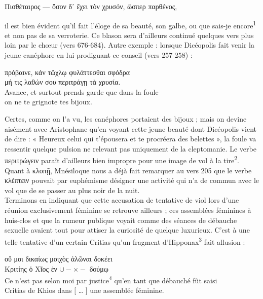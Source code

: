 \documentclass[12pt]{book}%
\newcommand{\italique}[1]{\textit{#1}}%
\newcommand{\citComm}[1]{\begin{quoting}[vskip=0pt] #1 \end{quoting}}%
\newcommand{\espace}[1]{\hspace{#1}}%
\newcommand{\francais}[1]{{\policeFr #1}}%
\newcommand{\debutNote}[1]{\edtext{}{\Cfootnote[nonum, nosep]{\espace{-1cm}\espace{-15pt}\textbf{\textbf{#1}}}}}%
\newcommand{\note}[2]{\edtext{}{\Cfootnote[nonum, nosep]{\espace{-15pt}\textbf{#1} #2}}}%
\newcommand{\marqueur}[1]{\textsuperscript{#1}}%
\newenvironment{groupe}{%
\pstart%
\ledgroup%
}{%
\pend %
}%
\begin{document}
\begin{pages}
\begin{Leftside}
\begin{groupe}
{{\citComm{Πισθέταιρος --- ὅσον δ᾽ ἔχει τὸν χρυσόν, ὥσπερ παρθένος,}%
il est bien évident qu'il fait l'éloge de sa beauté, son galbe, ou que sais-je encore\marqueur{1} et non pas de sa verroterie. Ce blason sera d'ailleurs continué quelques vers plus loin par le chœur (vers 676-684). 
Autre exemple : lorsque Dicéopolis fait venir la jeune canéphore en lui prodiguant ce conseil (vers 257-258) :%
\citComm{πρόβαινε, κἀν τὤχλῳ φυλάττεσθαι σφόδρα\\
μή τις λαθών σου περιτράγῃ τὰ χρυσία.\\
\francais{Avance, et surtout prends garde que dans la foule\\
on ne te grignote tes bijoux.}}%
Certes, comme on l'a vu, les canéphores portaient des bijoux ; mais on devine aisément avec Aristophane qu'en voyant cette jeune beauté dont Dicéopolis vient de dire : « Heureux celui qui t'épousera et te procréera des belettes », la foule va ressentir quelque pulsion ne relevant pas uniquement de la cleptomanie.
Le verbe περιτρώγειν paraît d'ailleurs bien impropre pour une image de vol à la tire\marqueur{2}.
Quant à κλοπῇ, Mnésiloque nous a déjà fait remarquer au vers 205 que le verbe κλέπτειν pouvait par euphémisme désigner une activité qui n'a de commun avec le vol que de se passer au plus noir de la nuit.\\
Terminons en indiquant que cette accusation de tentative de viol lors d'une réunion exclusivement féminine se retrouve ailleurs ; ces assemblées féminines à huis-clos et que la rumeur publique voyait comme des séances de débauche sexuelle avaient tout pour attiser la curiosité de quelque luxurieux. C'est à une telle tentative d'un certain Critias qu'un fragment d'Hipponax\marqueur{3} fait allusion :%
\citComm{οὔ μοι δικαίως μοιχὸς ἁλῶναι δοκέει\\
Κριτίης ὁ Χῖος ἐν $ \cup - \times - $ δούμῳ\\
Ce n'est pas selon moi par justice\marqueur{4} qu'en tant que débauché fût saisi\\
Critias de Khios dans $[$ … $]$ une assemblée féminine.}}%
\debutNote{894}%
}
\end{groupe}
\end{Leftside}
\end{pages}
\end{document}
